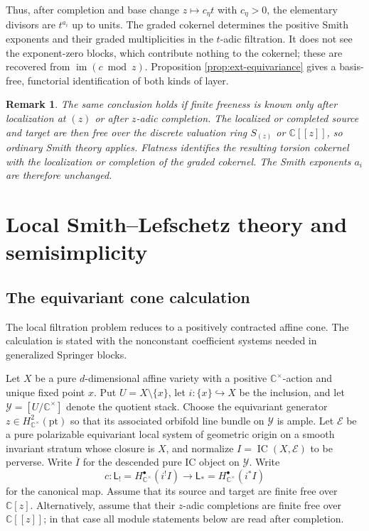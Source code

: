 \documentclass[10pt,a4paper]{amsart}
\newtheorem{remark}[theorem]{Remark}
\newcommand{\IC}{\operatorname{IC}}
\begin{document}
Thus, after completion and base change $z\mapsto c_\eta t$ with
$c_\eta>0$, the elementary divisors are $t^{a_i}$ up to units.  The graded
cokernel determines the positive Smith exponents and their graded
multiplicities in the $t$-adic filtration.  It does not see the
exponent-zero blocks, which contribute nothing to the cokernel; these are
recovered from $\operatorname{im}(c\bmod z)$.  Proposition
\ref{prop:ext-equivariance} gives a basis-free, functorial identification of
both kinds of layer.

\begin{remark}\label{rem:completed-smith}
The same conclusion holds if finite freeness is known only after localization
at $(z)$ or after $z$-adic completion.  The localized or completed source and
target are then free over the discrete valuation ring $S_{(z)}$ or
$\mathbb C[[z]]$, so ordinary Smith theory applies.  Flatness identifies the
resulting torsion cokernel with the localization or completion of the graded
cokernel.  The Smith exponents $a_i$ are therefore unchanged.
\end{remark}

\section{Local Smith--Lefschetz theory and semisimplicity}
\label{sec:local-smith}

\subsection{The equivariant cone calculation}

The local filtration problem reduces to a positively contracted affine
cone.  The calculation is stated with the nonconstant coefficient
systems needed in generalized Springer blocks.

Let $X$ be a pure $d$-dimensional affine variety with a positive
$\mathbb C^\times$-action and unique fixed point $x$.  Put
$U=X\setminus\{x\}$, let $i:\{x\}\hookrightarrow X$ be the inclusion, and
let $\mathcal Y=[U/\mathbb C^\times]$ denote the quotient stack.  Choose the
equivariant generator
$z\in H^2_{\mathbb C^\times}(\mathrm{pt})$ so that its associated orbifold
line bundle on $\mathcal Y$ is ample.  Let
$\mathcal E$ be a pure polarizable equivariant local system of geometric
origin on a smooth invariant
stratum whose closure is $X$, and normalize
$I=\IC(X,\mathcal E)$ to be perverse.  Write $\overline I$ for the descended
pure IC object on $\mathcal Y$.  Write
\[
 c:\mathsf L_!=H^\bullet_{\mathbb C^\times}(i^!I)
 \longrightarrow
 \mathsf L_*=H^\bullet_{\mathbb C^\times}(i^*I)
\]
for the canonical map.  Assume that its source and target
are finite free over $\mathbb C[z]$.  Alternatively, assume that their
$z$-adic completions are finite free over $\mathbb C[[z]]$; in that case all
module statements below are read after completion.
\end{document}
